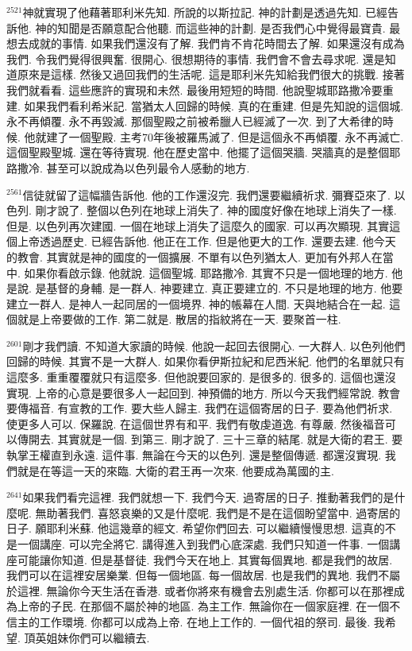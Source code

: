 \documentclass{book}
\begin{document}
$^{2521}$神就實現了他藉著耶利米先知.
所說的以斯拉記.
神的計劃是透過先知.
已經告訴他.
神的知聞是否願意配合他聽.
而這些神的計劃.
是否我們心中覺得最寶貴.
最想去成就的事情.
如果我們還沒有了解.
我們肯不肯花時間去了解.
如果還沒有成為我們.
令我們覺得很興奮.
很開心.
很想期待的事情.
我們會不會去尋求呢.
還是知道原來是這樣.
然後又過回我們的生活呢.
這是耶利米先知給我們很大的挑戰.
接著我們就看看.
這些應許的實現和未然.
最後用短短的時間.
他說聖城耶路撒冷要重建.
如果我們看利希米記.
當猶太人回歸的時候.
真的在重建.
但是先知說的這個城.
永不再傾覆.
永不再毀滅.
那個聖殿之前被希臘人已經滅了一次.
到了大希律的時候.
他就建了一個聖殿.
主考70年後被羅馬滅了.
但是這個永不再傾覆.
永不再滅亡.
這個聖殿聖城.
還在等待實現.
他在歷史當中.
他擺了這個哭牆.
哭牆真的是整個耶路撒冷.
甚至可以說成為以色列最令人感動的地方.

$^{2561}$信徒就留了這幅牆告訴他.
他的工作還沒完.
我們還要繼續祈求.
彌賽亞來了.
以色列.
剛才說了.
整個以色列在地球上消失了.
神的國度好像在地球上消失了一樣.
但是.
以色列再次建國.
一個在地球上消失了這麼久的國家.
可以再次顯現.
其實這個上帝透過歷史.
已經告訴他.
他正在工作.
但是他更大的工作.
還要去建.
他今天的教會.
其實就是神的國度的一個擴展.
不單有以色列猶太人.
更加有外邦人在當中.
如果你看啟示錄.
他就說.
這個聖城.
耶路撒冷.
其實不只是一個地理的地方.
他是說.
是基督的身輔.
是一群人.
神要建立.
真正要建立的.
不只是地理的地方.
他要建立一群人.
是神人一起同居的一個境界.
神的帳幕在人間.
天與地結合在一起.
這個就是上帝要做的工作.
第二就是.
散居的指紋將在一天.
要聚首一柱.

$^{2601}$剛才我們讀.
不知道大家讀的時候.
他說一起回去很開心.
一大群人.
以色列他們回歸的時候.
其實不是一大群人.
如果你看伊斯拉紀和尼西米紀.
他們的名單就只有這麼多.
重重覆覆就只有這麼多.
但他說要回家的.
是很多的.
很多的.
這個也還沒實現.
上帝的心意是要很多人一起回到.
神預備的地方.
所以今天我們經常說.
教會要傳福音.
有宣教的工作.
要大些人歸主.
我們在這個寄居的日子.
要為他們祈求.
使更多人可以.
保羅說.
在這個世界有和平.
我們有敬虔道逸.
有尊嚴.
然後福音可以傳開去.
其實就是一個.
到第三.
剛才說了.
三十三章的結尾.
就是大衛的君王.
要執掌王權直到永遠.
這件事.
無論在今天的以色列.
還是整個傳遞.
都還沒實現.
我們就是在等這一天的來臨.
大衛的君王再一次來.
他要成為萬國的主.

$^{2641}$如果我們看完這裡.
我們就想一下.
我們今天.
過寄居的日子.
推動著我們的是什麼呢.
無助著我們.
喜怒哀樂的又是什麼呢.
我們是不是在這個盼望當中.
過寄居的日子.
願耶利米蘇.
他這幾章的經文.
希望你們回去.
可以繼續慢慢思想.
這真的不是一個講座.
可以完全將它.
講得進入到我們心底深處.
我們只知道一件事.
一個講座可能讓你知道.
但是基督徒.
我們今天在地上.
其實每個異地.
都是我們的故居.
我們可以在這裡安居樂業.
但每一個地區.
每一個故居.
也是我們的異地.
我們不屬於這裡.
無論你今天生活在香港.
或者你將來有機會去別處生活.
你都可以在那裡成為上帝的子民.
在那個不屬於神的地區.
為主工作.
無論你在一個家庭裡.
在一個不信主的工作環境.
你都可以成為上帝.
在地上工作的.
一個代祖的祭司.
最後.
我希望.
頂英姐妹你們可以繼續去.
\end{document}
